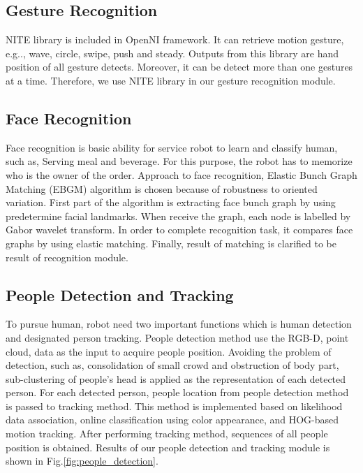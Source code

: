 \documentclass{llncs}
\begin{document}
\subsection{Gesture Recognition}

NITE library is included in OpenNI framework. It can retrieve motion gesture, e.g.., wave, circle, swipe, push and steady. Outputs from this library are hand position of all gesture detects. Moreover, it can be detect more than one gestures at a time. Therefore, we use NITE library in our gesture recognition module.

\subsection{Face Recognition}

Face recognition is basic ability for service robot to learn and classify human, such as, Serving meal and beverage. For this purpose, the robot has to memorize who is the owner of the order. Approach to face recognition, Elastic Bunch Graph Matching (EBGM) algorithm is chosen because of robustness to oriented variation\cite{face_reg}. First part of the algorithm is extracting face bunch graph by using predetermine facial landmarks. When receive the graph, each node is labelled by Gabor wavelet transform. In order to complete recognition task, it compares face graphs by using elastic matching. Finally, result of matching is clarified to be result of recognition module.

\subsection{People Detection and Tracking}

To pursue human, robot need two important functions which is human detection and designated person tracking. People detection method use the RGB-D, point cloud, data as the input to acquire people position. Avoiding the problem of detection, such as, consolidation of small crowd and obstruction of body part, sub-clustering of people's head is applied as the representation of each detected person. For each detected person, people location from people detection method is passed to tracking method. This method is implemented based on likelihood data association, online classification using color appearance, and HOG-based motion tracking\cite{pp_detect}. After performing tracking method, sequences of all people position is obtained. Results of our people detection and tracking module is shown in Fig.\ref{fig:people_detection}.
\end{document}
